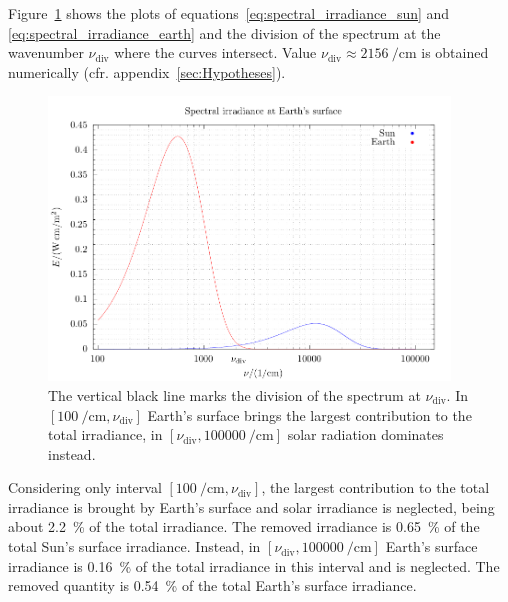 \documentclass[a4paper,10pt,final,twocolumn]{article}
\begin{document}
Figure~\ref{fig:spectral_irradiance} shows the plots of equations~\eqref{eq:spectral_irradiance_sun} and \eqref{eq:spectral_irradiance_earth} and the division of the spectrum at the wavenumber $\nu_\text{div}$ where the curves intersect. Value $\nu_\text{div} \approx \qty{2156}{\per\centi\metre}$ is obtained numerically (cfr. appendix~\ref{sec:Hypotheses}).
\begin{figure}[h]
  \centering
  \includegraphics*[keepaspectratio=true,width=0.95\textwidth]{spectral_irradiance}
  \caption{The vertical black line marks the division of the spectrum at $\nu_\text{div}$. In $[\qty{100}{\per\centi\metre}, \nu_\text{div}]$ Earth's surface brings the largest contribution to the total irradiance, in $[\nu_\text{div}, \qty{100000}{\per\centi\metre}]$ solar radiation dominates instead.}
  \label{fig:spectral_irradiance}
\end{figure}

Considering only interval $[\qty{100}{\per\centi\metre}, \nu_\text{div}]$, the largest contribution to the total irradiance is brought by Earth's surface and solar irradiance is neglected, being about \qty{2.2}{\percent} of the total irradiance. The removed irradiance is \qty{0.65}{\percent} of the total Sun's surface irradiance. %
Instead, in $[\nu_\text{div}, \qty{100000}{\per\centi\metre}]$ Earth's surface irradiance is \qty{0.16}{\percent} of the total irradiance in this interval and is neglected. The removed quantity is \qty{0.54}{\percent} of the total Earth's surface irradiance. %



\end{document}
